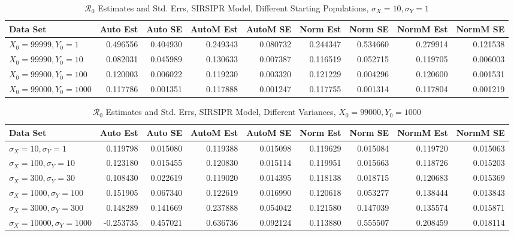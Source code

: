 \documentclass[12pt]{article}
\newcommand{\rr}{\ensuremath{\mathcal{R}_0}}
\begin{document}
\begin{table}[H]
	
	\caption{$\rr$ Estimates and Std. Errs, SIRSIPR Model,
		Different Starting Populations, 
		$\sigma_X = 10, \sigma_Y = 1$}
	\begin{footnotesize}
		\hskip -1.7cm
		\begin{tabular}{l|r|r|r|r|r|r|r|r}
			\hline
			Data Set & Auto Est & Auto SE & AutoM Est & AutoM SE & Norm Est & Norm SE & NormM Est & NormM SE\\
			\hline
			$X_0 = 99999, Y_0 = 1$ & 0.496556 & 0.404930 & 0.249343 & 0.080732 & 0.244347 & 0.534660 & 0.279914 & 0.121538\\
			\hline
			$X_0 = 99990, Y_0 = 10$ & 0.082031 & 0.045989 & 0.130633 & 0.007387 & 0.116519 & 0.052715 & 0.119705 & 0.006003\\
			\hline
			$X_0 = 99900, Y_0 = 100$ & 0.120003 & 0.006022 & 0.119230 & 0.003320 & 0.121229 & 0.004296 & 0.120600 & 0.001531\\
			\hline
			$X_0 = 99000, Y_0 = 1000$ & 0.117786 & 0.001351 & 0.117888 & 0.001247 & 0.117755 & 0.001314 & 0.117804 & 0.001219\\
			\hline
		\end{tabular}
	\end{footnotesize}
\end{table}

\begin{table}[H]
	
	\caption{$\rr$ Estimates and Std. Errs, SIRSIPR Model,
		Different Variances, 
		$X_0 = 99000, Y_0 = 1000$}
	\begin{footnotesize}
		\hskip -1.7cm
		\begin{tabular}{l|r|r|r|r|r|r|r|r}
			\hline
			Data Set & Auto Est & Auto SE & AutoM Est & AutoM SE & Norm Est & Norm SE & NormM Est & NormM SE\\
			\hline
			$\sigma_X = 10, \sigma_Y = 1$ & 0.119798 & 0.015080 & 0.119388 & 0.015098 & 0.119629 & 0.015084 & 0.119720 & 0.015063\\
			\hline
			$\sigma_X = 100, \sigma_Y = 10$ & 0.123180 & 0.015455 & 0.120830 & 0.015114 & 0.119951 & 0.015663 & 0.118726 & 0.015203\\
			\hline
			$\sigma_X = 300, \sigma_Y = 30$ & 0.108430 & 0.022619 & 0.119020 & 0.014395 & 0.118138 & 0.018715 & 0.120683 & 0.015369\\
			\hline
			$\sigma_X = 1000, \sigma_Y = 100$ & 0.151905 & 0.067340 & 0.122619 & 0.016990 & 0.120618 & 0.053277 & 0.138444 & 0.013843\\
			\hline
			$\sigma_X = 3000, \sigma_Y = 300$ & 0.148289 & 0.141669 & 0.237888 & 0.054042 & 0.121580 & 0.147039 & 0.135574 & 0.015871\\
			\hline
			$\sigma_X = 10000, \sigma_Y = 1000$ & -0.253735 & 0.457021 & 0.636736 & 0.092124 & 0.113880 & 0.555507 & 0.208459 & 0.018114\\
			\hline
		\end{tabular}
	\end{footnotesize}
\end{table}
\end{document}
